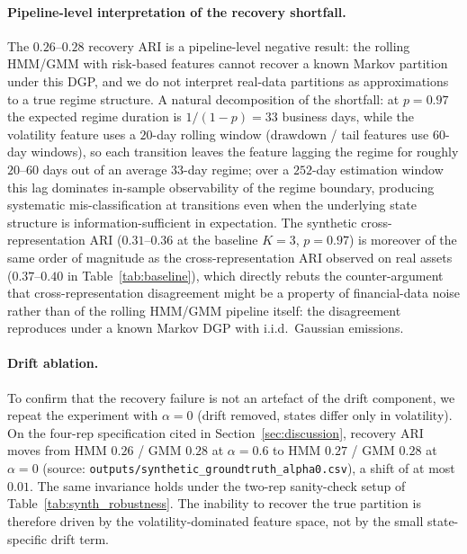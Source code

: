 \documentclass[preprint,12pt,authoryear]{elsarticle}
\begin{document}
\paragraph{Pipeline-level interpretation of the recovery shortfall.}
The $0.26$--$0.28$ recovery ARI is a pipeline-level negative result: the rolling HMM/GMM with risk-based features cannot recover a known Markov partition under this DGP, and we do not interpret real-data partitions as approximations to a true regime structure. A natural decomposition of the shortfall: at $p=0.97$ the expected regime duration is $1/(1{-}p)=33$ business days, while the volatility feature uses a $20$-day rolling window (drawdown / tail features use $60$-day windows), so each transition leaves the feature lagging the regime for roughly $20$--$60$ days out of an average $33$-day regime; over a $252$-day estimation window this lag dominates in-sample observability of the regime boundary, producing systematic mis-classification at transitions even when the underlying state structure is information-sufficient in expectation. The synthetic cross-representation ARI ($0.31$--$0.36$ at the baseline $K=3$, $p=0.97$) is moreover of the same order of magnitude as the cross-representation ARI observed on real assets ($0.37$--$0.40$ in Table~\ref{tab:baseline}), which directly rebuts the counter-argument that cross-representation disagreement might be a property of financial-data noise rather than of the rolling HMM/GMM pipeline itself: the disagreement reproduces under a known Markov DGP with i.i.d.\ Gaussian emissions.

\paragraph{Drift ablation.}
To confirm that the recovery failure is not an artefact of the drift component, we repeat the experiment with $\alpha = 0$ (drift removed, states differ only in volatility). On the four-rep specification cited in Section~\ref{sec:discussion}, recovery ARI moves from HMM $0.26$ / GMM $0.28$ at $\alpha=0.6$ to HMM $0.27$ / GMM $0.28$ at $\alpha=0$ (source: \texttt{outputs/synthetic\_groundtruth\_alpha0.csv}), a shift of at most $0.01$. The same invariance holds under the two-rep sanity-check setup of Table~\ref{tab:synth_robustness}. The inability to recover the true partition is therefore driven by the volatility-dominated feature space, not by the small state-specific drift term.
\end{document}
